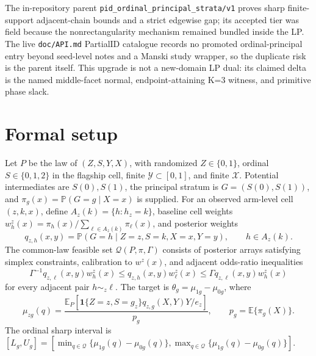 \documentclass[11pt]{article}
\newcommand{\E}{\mathbb{E}}
\renewcommand{\Pr}{\mathbb{P}}
\newcommand{\one}{\mathbf{1}}
\theoremstyle{definition}
\theoremstyle{plain}
\theoremstyle{remark}
\begin{document}
The in-repository parent \texttt{pid\_ordinal\_principal\_strata/v1} proves sharp finite-support adjacent-chain bounds and a strict edgewise gap; its accepted tier was field because the nonrectangularity mechanism remained bundled inside the LP.
The live \texttt{doc/API.md} PartialID catalogue records no promoted ordinal-principal entry beyond seed-level notes and a Manski study wrapper, so the duplicate risk is the parent itself.
This upgrade is not a new-domain LP dual: its claimed delta is the named middle-facet normal, endpoint-attaining K=3 witness, and primitive phase slack.

\section{Formal setup}
Let \(P\) be the law of \((Z,S,Y,X)\), with randomized \(Z\in\{0,1\}\), ordinal \(S\in\{0,1,2\}\) in the flagship cell, finite \(\mathcal Y\subset[0,1]\), and finite \(\mathcal X\).  Potential intermediates are \(S(0),S(1)\), the principal stratum is \(G=(S(0),S(1))\), and \(\pi_g(x)=\Pr(G=g\mid X=x)\) is supplied.  For an observed arm-level cell \((z,k,x)\), define \(A_z(k)=\{h:h_z=k\}\), baseline cell weights \(w_h^z(x)=\pi_h(x)/\sum_{\ell\in A_z(k)}\pi_\ell(x)\), and posterior weights
\[
  q_{z,h}(x,y)=\Pr(G=h\mid Z=z,S=k,X=x,Y=y),\qquad h\in A_z(k).
\]
The common-law feasible set \(\mathcal Q(P,\pi,\Gamma)\) consists of posterior arrays satisfying simplex constraints, calibration to \(w^z(x)\), and adjacent odds-ratio inequalities
\[
  \Gamma^{-1}q_{z,\ell}(x,y)w_h^z(x)
  \le q_{z,h}(x,y)w_\ell^z(x)
  \le \Gamma q_{z,\ell}(x,y)w_h^z(x)
\]
for every adjacent pair \(h\sim_z\ell\).  The target is \(\theta_g=\mu_{1g}-\mu_{0g}\), where
\[
  \mu_{zg}(q)=\frac{\E_P[\one\{Z=z,S=g_z\}q_{z,g}(X,Y)Y/e_z]}{p_g},
  \qquad p_g=\E\{\pi_g(X)\}.
\]
The ordinal sharp interval is \([L_g,U_g]=[\min_{q\in\mathcal Q}\{\mu_{1g}(q)-\mu_{0g}(q)\},\max_{q\in\mathcal Q}\{\mu_{1g}(q)-\mu_{0g}(q)\}]\).
\end{document}
